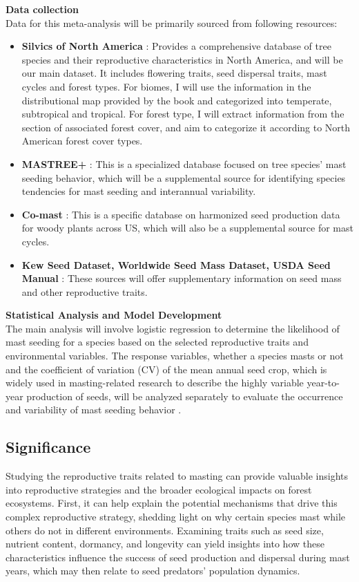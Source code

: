 \documentclass[11pt,letter]{article}
\begin{document}
\textbf{Data collection}\\
Data for this meta-analysis will be primarily sourced from following resources:
	\begin{itemize}
	\item \textbf{Silvics of North America} \citep{burns1990silvics}: Provides a comprehensive database of tree species and their reproductive characteristics in North America, and will be our main dataset. It includes flowering traits, seed dispersal traits, mast cycles and forest types. For biomes, I will use the information in the distributional map provided by the book and categorized into temperate, subtropical and tropical. For forest type, I will extract information from the section of associated forest cover, and aim to categorize it according to North American forest cover types.
	\item \textbf{MASTREE+} \citep{hacket2022mastree+}: This is a specialized database focused on tree species' mast seeding behavior, which will be a supplemental source for identifying species tendencies for mast seeding and interannual variability.
	\item \textbf{Co-mast} \citep{nigro2025co}: This is a specific database on harmonized seed production data for woody plants across US, which will also be a supplemental source for mast cycles.
	\item \textbf{Kew Seed Dataset, Worldwide Seed Mass Dataset, USDA Seed Manual} \citep{bonner2008woody, KewSeedDatabase, Moles2015SeedMass}: These sources will offer supplementary information on seed mass and other reproductive traits.
	\end{itemize}
\textbf{Statistical Analysis and Model Development}\\
The main analysis will involve logistic regression to determine the likelihood of mast seeding for a species based on the selected reproductive traits and environmental variables. The response variables, whether a species masts or not and the coefficient of variation (CV) of the mean annual seed crop,  which is widely used in masting-related research to describe the highly variable year-to-year production of seeds, will be analyzed separately to evaluate the occurrence and variability of mast seeding behavior \citep{kelly2002mast}.

\subsection{Significance} 
Studying the reproductive traits related to masting can provide valuable insights into reproductive strategies and the broader ecological impacts on forest ecosystems. First, it can help explain the potential mechanisms that drive this complex reproductive strategy, shedding light on why certain species mast while others do not in different environments. Examining traits such as seed size, nutrient content, dormancy, and longevity can yield insights into how these characteristics influence the success of seed production and dispersal during mast years, which may then relate to seed predators' population dynamics.
\end{document}
